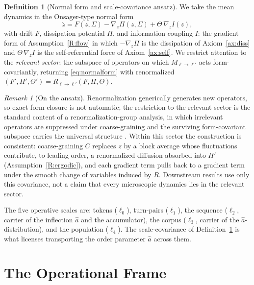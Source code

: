 \documentclass[11pt]{article}
\theoremstyle{plain}
\theoremstyle{definition}
\newtheorem{definition}[theorem]{Definition}
\theoremstyle{remark}
\newtheorem{remark}[theorem]{Remark}
\begin{document}
\begin{definition}[Normal form and scale-covariance ansatz]\label{prop:forminv}
We take the mean dynamics in the Onsager-type normal form
\begin{equation}\label{eq:normalform}
\dot z = F(z,\Sigma)-\nabla_z\Pi(z,\Sigma)+\Theta\,\nabla_z I(z),
\end{equation}
with drift $F$, dissipation potential $\Pi$, and information coupling $I$: the gradient form of Assumption~\ref{R:flow} in which $-\nabla_z\Pi$ is the dissipation of Axiom~\ref{ax:diss} and $\Theta\,\nabla_z I$ is the self-referential force of Axiom~\ref{ax:self}. We restrict attention to the \emph{relevant sector}: the subspace of operators on which $M_{\ell\to\ell'}$ acts form-covariantly, returning \eqref{eq:normalform} with renormalized $(F',\Pi',\Theta')=R_{\ell\to\ell'}(F,\Pi,\Theta)$.
\end{definition}
\begin{remark}[On the ansatz]
Renormalization generically generates new operators, so exact form-closure is not automatic; the restriction to the relevant sector is the standard content of a renormalization-group analysis, in which irrelevant operators are suppressed under coarse-graining and the surviving form-covariant subspace carries the universal structure \citep{kadanoff1966,wilson1971}. Within this sector the construction is consistent: coarse-graining $C$ replaces $z$ by a block average whose fluctuations contribute, to leading order, a renormalized diffusion absorbed into $\Pi'$ (Assumption~\ref{R:ergodic}), and each gradient term pulls back to a gradient term under the smooth change of variables induced by $R$. Downstream results use only this covariance, not a claim that every microscopic dynamics lies in the relevant sector.
\end{remark}

The five operative scales are: tokens ($\ell_0$), turn-pairs ($\ell_1$), the sequence ($\ell_2$, carrier of the inflection $\hat a$ and the accumulator), the corpus ($\ell_3$, carrier of the $\hat a$-distribution), and the population ($\ell_4$). The scale-covariance of Definition~\ref{prop:forminv} is what licenses transporting the order parameter $\hat a$ across them.

\section{The Operational Frame}\label{sec:operational}
\end{document}

